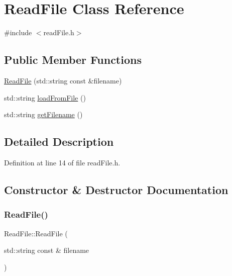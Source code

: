 \hypertarget{class_read_file}{}\section{Read\+File Class Reference}
\label{class_read_file}


{\ttfamily \#include $<$read\+File.\+h$>$}

\subsection*{Public Member Functions}
\begin{DoxyCompactItemize}
\item 
\mbox{\hyperlink{class_read_file_ae297f0539380fc9b703a1bceda2ce820}{Read\+File}} (std\+::string const \&filename)
\item 
std\+::string \mbox{\hyperlink{class_read_file_af5ca728cd9c884966d53e62ab4de483f}{load\+From\+File}} ()
\item 
std\+::string \mbox{\hyperlink{class_read_file_a9835264c9ec95cfdbc1349573402fc01}{get\+Filename}} ()
\end{DoxyCompactItemize}


\subsection{Detailed Description}


Definition at line 14 of file read\+File.\+h.



\subsection{Constructor \& Destructor Documentation}
\mbox{\label{class_read_file_ae297f0539380fc9b703a1bceda2ce820}} 
\subsubsection{\texorpdfstring{Read\+File()}{ReadFile()}}
{\footnotesize\ttfamily Read\+File\+::\+Read\+File (\begin{DoxyParamCaption}\item[{std\+::string const \&}]{filename }\end{DoxyParamCaption})}







